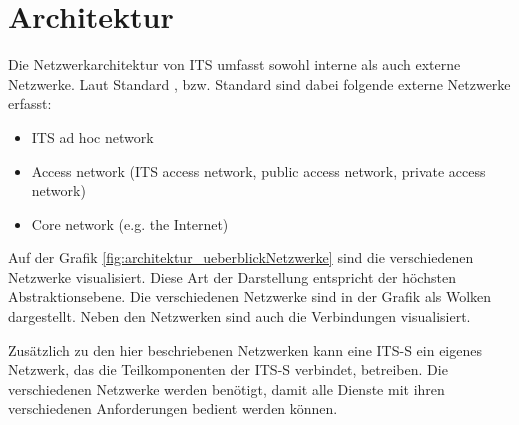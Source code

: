 \chapter{Architektur  \label{chap_archtitektur}}
Die Netzwerkarchitektur von \ac{ITS} umfasst sowohl interne als auch externe Netzwerke. Laut Standard \cite{etsi302636-3}, bzw. Standard \cite{etsi102636-3} sind dabei folgende externe Netzwerke erfasst:

\begin{itemize}
 	\item ITS ad hoc network
	\item Access network (ITS access network, public access network, private access network)
	\item Core network (e.g. the Internet)
\end{itemize}

Auf der Grafik \autoref{fig:architektur_ueberblickNetzwerke} sind die verschiedenen Netzwerke visualisiert. Diese Art der Darstellung entspricht der höchsten Abstraktionsebene. Die verschiedenen Netzwerke sind in der Grafik als Wolken dargestellt. Neben den Netzwerken sind auch die Verbindungen visualisiert.


Zusätzlich zu den hier beschriebenen Netzwerken kann eine \ac{ITS-S} ein eigenes Netzwerk, das die Teilkomponenten der \ac{ITS-S} verbindet, betreiben. Die verschiedenen Netzwerke werden benötigt, damit alle Dienste mit ihren verschiedenen Anforderungen bedient werden können.

